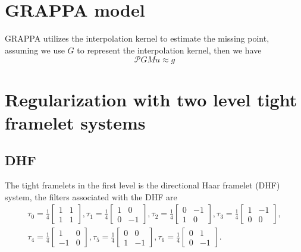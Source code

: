 \documentclass[UTF8]{article}
\begin{document}
\section{GRAPPA model}
\par GRAPPA utilizes the interpolation kernel to estimate the missing point, assuming we use $G$ to represent the interpolation kernel, then we have
\begin{equation} \label{GRAPPA_equation}
	\mathcal{P}GMu \approx g
\end{equation}

\section{Regularization with two level tight framelet systems}
\subsection{DHF}
\par The tight framelets in the first level is the directional Haar framelet (DHF) system, the filters associated with the DHF are
\begin{align*}
	\tau_0 = \frac{1}{4}\begin{bmatrix}
		1 & 1\\
		1 & 1
	\end{bmatrix},
	\tau_1 = \frac{1}{4}\begin{bmatrix}
		1 & 0\\
		0 & -1
	\end{bmatrix},
	\tau_2 = \frac{1}{4}\begin{bmatrix}
		0 & -1\\
		1 & 0
	\end{bmatrix},
	\tau_3 = \frac{1}{4}\begin{bmatrix}
		1 & -1\\
		0 & 0
	\end{bmatrix},\\
	\tau_4 = \frac{1}{4}\begin{bmatrix}
		1 & 0\\
		-1 & 0
	\end{bmatrix},
	\tau_5 = \frac{1}{4}\begin{bmatrix}
		0 & 0\\
		1 & -1
	\end{bmatrix},
	\tau_6 = \frac{1}{4}\begin{bmatrix}
		0 & 1\\
		0 & -1
	\end{bmatrix}.
\end{align*}
\end{document}
